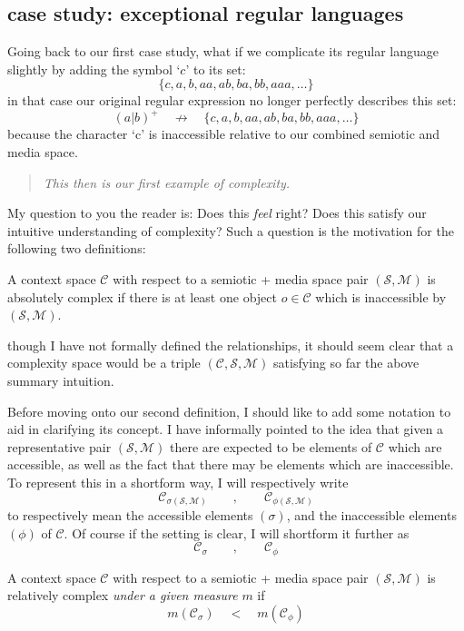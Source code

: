 \documentclass[twoside]{article}
\newenvironment{definition}[1][Definition]{\begin{trivlist}
\item[\hskip \labelsep {\bfseries #1:}]}{\end{trivlist}}
\begin{document}
\subsection*{case study: exceptional regular languages}

Going back to our first case study, what if we complicate its regular language slightly by adding the symbol `$ c $' to its set:
$$ \{c,a,b,aa,ab,ba,bb,aaa,\ldots\} $$
in that case our original regular expression no longer perfectly describes this set:
$$ (a|b)^+\quad\not\to\quad\{c,a,b,aa,ab,ba,bb,aaa,\ldots\} $$
because the character `c' is inaccessible relative to our combined semiotic and media space.

\begin{verse}
\em This then is our first example of complexity.
\end{verse}

My question to you the reader is: Does this \emph{feel} right? Does this satisfy our intuitive understanding of complexity?
Such a question is the motivation for the following two definitions:

\begin{definition}[Absolute Complexity (v0.1)]
A context space $ \mathcal{C} $ with respect to a semiotic + media space pair $ (\mathcal{S}, \mathcal{M}) $
is absolutely complex if there is at least one object $ o\in\mathcal{C} $ which is inaccessible by $ (\mathcal{S}, \mathcal{M}) $.
\end{definition}
though I have not formally defined the relationships, it should seem clear that a complexity space would be a triple
$ (\mathcal{C},\mathcal{S},\mathcal{M}) $ satisfying so far the above summary intuition.

Before moving onto our second definition, I should like to add some notation to aid in clarifying its concept. I have informally
pointed to the idea that given a representative pair $ (\mathcal{S}, \mathcal{M}) $ there are expected to be elements of $ \mathcal{C} $
which are accessible, as well as the fact that there may be elements which are inaccessible. To represent this in a shortform
way, I will respectively write
$$ \mathcal{C}_{\sigma(\mathcal{S},\mathcal{M})}\qquad,\qquad\mathcal{C}_{\phi(\mathcal{S},\mathcal{M})} $$
to respectively mean the accessible elements $ (\sigma) $, and the inaccessible elements $ (\phi) $ of $ \mathcal{C} $.
Of course if the setting is clear, I will shortform it further as
$$ \mathcal{C}_\sigma\qquad,\qquad\mathcal{C}_\phi $$

\begin{definition}[Relative Complexity (v0.1)]
A context space $ \mathcal{C} $ with respect to a semiotic + media space pair $ (\mathcal{S}, \mathcal{M}) $
is relatively complex \emph{under a given measure} $ m $ if
$$ m(\mathcal{C}_\sigma)\quad <\quad m(\mathcal{C}_\phi) $$
\end{definition}
\end{document}
